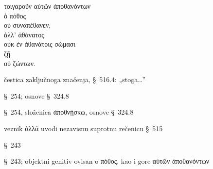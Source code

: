 
{\large
\begin{greek}
\noindent τοιγαροῦν αὐτῶν ἀποθανόντων \\
ὁ πόθος \\
οὐ συναπέθανεν, \\
ἀλλ' ἀθάνατος \\
\tabto{2em} οὐκ ἐν ἀθανάτοις σώμασι \\
ζῇ \\
\tabto{2em} οὐ ζώντων. \\

\end{greek}
}

\begin{description}[noitemsep]
\item[τοιγαροῦν] čestica zaključnoga značenja, §~516.4: „stoga\dots”
\item[ἀποθανόντων] §~254; osnove §~324.8
\item[οὐ συναπέθανεν] §~254, složenica ἀποθνῄσκω, osnove §~324.8
\item[ἀλλ'] veznik ἀλλά uvodi nezavisnu suprotnu rečenicu §~515
\item[ζῇ] §~243
\item[ζώντων] §~243; objektni genitiv ovisan o πόθος, kao i gore \textgreek{αὐτῶν ἀποθανόντων}

\end{description}

